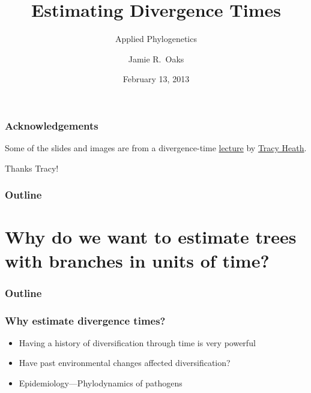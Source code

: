 


\title[Estimating Divergence Times]{Estimating Divergence Times}
\subtitle{Applied Phylogenetics}

\author[J.\ Oaks]{
    Jamie R.\ Oaks
}

\date{February 13, 2013}



\maketitle

\begin{frame}
    \frametitle{Acknowledgements}

    Some of the slides and images are from a divergence-time
    \href{https://molevol.mbl.edu/wiki/images/6/6f/Bodega_2013_divtime_lecture.pdf}{lecture}
    by \href{http://phylo.bio.ku.edu/content/tracy-heath}{Tracy Heath}.
    
    \bigskip
    Thanks Tracy!
\end{frame}

\begin{frame}
\frametitle{Outline}
\tableofcontents
\end{frame}


\section{Why do we want to estimate trees with branches in units of time?}

\begin{frame}
\frametitle{Outline}
\tableofcontents[currentsection]
\end{frame}

\begin{frame}
    \frametitle{Why estimate divergence times?}
    \begin{itemize}
        \item Having a history of diversification through time is very powerful
        \item Have past environmental changes affected diversification?
        \item Epidemiology---Phylodynamics of pathogens
    \end{itemize}
\end{frame}

